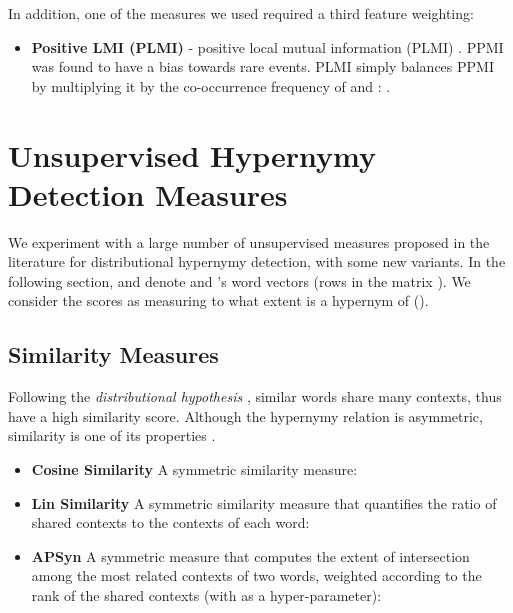 \documentclass[11pt]{article}
\begin{document}
\vspace*{-2pt}
In addition, one of the measures we used \cite{santus2014chasing} required a third feature weighting:

\begin{itemize}
\vspace*{-2pt}
\item \textbf{Positive LMI (PLMI)} - positive local mutual information (PLMI) \cite{evert2005statistics,evert2008corpora}. PPMI was found to have a bias towards rare events. PLMI simply balances PPMI by multiplying it by the co-occurrence frequency of  and : .

\end{itemize}
\vspace*{-2pt}

\setlength{\abovedisplayskip}{0.01cm}
\setlength{\belowdisplayskip}{0.01cm}

\section{Unsupervised Hypernymy Detection Measures}
\label{sec:measures}

We experiment with a large number of unsupervised measures proposed in the literature for distributional hypernymy detection, with some new variants. In the following section,  and  denote  and 's word vectors (rows in the matrix ). We consider the scores as measuring to what extent  is a hypernym of  (). 

\newcommand{\norm}[1]{\left\lVert #1 \right\rVert}

\subsection{Similarity Measures}
\label{sec:similarity_measures}

Following the \emph{distributional hypothesis} \cite{harris1954distributional}, similar words share many contexts, thus have a high similarity score. Although the hypernymy relation is asymmetric, similarity is one of its properties \cite{santus2014chasing}.

\begin{itemize}[leftmargin=*]

	\item \textbf{Cosine Similarity} \cite{salton1986introduction} A symmetric similarity measure:
	
	
	
	\item \textbf{Lin Similarity} \cite{lin1998information} A symmetric similarity measure that quantifies the ratio of shared contexts to the contexts of each word:
	
	
	
	\item \textbf{APSyn} \cite{santus2016unsupervised} A symmetric measure that computes the extent of intersection among the  most related contexts of two words, weighted according to the rank of the shared contexts (with  as a hyper-parameter):

	
	
\end{itemize}
\end{document}
